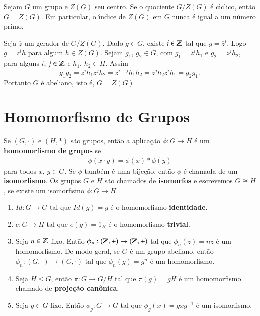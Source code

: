 \begin{proposicao}
	Sejam $G$ um grupo e $Z(G)$ seu centro. Se o quociente $G/Z(G)$ \'e c{\'\i}clico, ent\~ao $G = Z(G)$. Em particular, o {\'\i}ndice de $Z(G)$ em $G$ nunca \'e igual a um n\'umero primo.
\end{proposicao}
\begin{prova}
	Seja $\overline{z}$ um gerador de $G/Z(G)$. Dado $g \in G$, existe $i \in \mathbb{Z}$ tal que $\overline{g} = \overline{z}^i$. Logo $g = z^ih$ para algum $h \in Z(G)$. Sejam $g_1$, $g_2 \in G$, com $g_1 = z^ih_1$ e $g_2 = z^jh_2$, para alguns $i$, $j \in \mathbb{Z}$ e $h_1$, $h_2 \in H$. Assim
	\[
		g_1g_2 = z^ih_1z^jh_2 = z^{i+j}h_1h_2 = z^jh_2z^ih_1 = g_2g_1.
	\]
	Portanto $G$ \'e abeliano, isto \'e, $G = Z(G)$
\end{prova}


\section{Homomorfismo de Grupos} %
\label{sec:homomorfismo_de_grupos}

\begin{definicao}
	Se $(G,\cdot)$ e $(H,*)$ s\~ao grupos, ent\~ao a aplica\c{c}\~ao $\phi : G \to H$ \'e um \textbf{homomorfismo de grupos} se
	\begin{align}\label{definicao_homomorfismo}
		\phi(x\cdot y) = \phi(x)*\phi(y)
	\end{align}
	para todos $x$, $y \in G$. Se $\phi$ tamb\'em \'e uma bije\c{c}\~ao, ent\~ao $\phi$ \'e chamada de um \textbf{isomorfismo}. Os grupos $G$ e $H$ s\~ao chamados de \textbf{isomorfos} e escrevemos $G \cong H$, se existe um isomorfismo $\phi: G \to H$.
\end{definicao}

\begin{exemplos}
	\begin{enumerate}[label=({\arabic*})]
		\item $Id : G \to G$ tal que $Id(g) = g$ \'e o homomorfismo \textbf{identidade}.
		\item $e : G \to H$ tal que $e(g) = 1_H$ \'e o homomorfismo \textbf{trivial}.
		\item Seja $n \in \mathbb{Z}$ fixo. Ent\~ao $\phi_n : (\mathbb{Z},+) \to (\mathbb{Z}, +)$ tal que $\phi_n(z) = nz$ \'e um homomorfismo. De modo geral, se $G$ \'e um grupo abeliano, ent\~ao $\phi_n : (G, \cdot) \to (G, \cdot)$ tal que $\phi_n(g) = g^n$ \'e um homomorfismo.
		\item Seja $H \unlhd G$, ent\~ao $\pi : G \to G/H$ tal que $\pi(g) = gH$ \'e um homomorfismo chamado de \textbf{proje\c{c}\~ao can\^onica}.
		\item Seja $g \in G$ fixo. Ent\~ao $\phi_g : G \to G$ tal que $\phi_g(x) = gxg^{-1}$ \'e um isomorfismo.
	\end{enumerate}
\end{exemplos}

